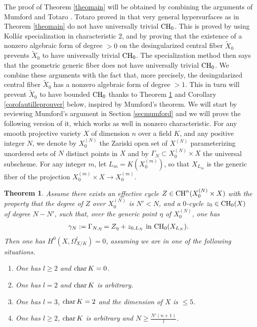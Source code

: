 \documentclass[10pt]{article}
\newtheorem{theo}{Theorem}[section]
\begin{document}
The proof of Theorem \ref{theomain} will be obtained by combining the arguments of Mumford \cite{mumford} and Totaro \cite{totaro}.  Totaro proved in \cite{totaro} that very general  hypersurfaces as in Theorem \ref{theomain} do not  have universally trivial ${\rm CH}_0$. This is proved by using  Koll\'ar specialization \cite{kollar} in characteristic $2$, and by proving that the existence of a nonzero algebraic form of degree $>0$ on the desingularized central  fiber  $\widetilde{X}_0$ prevents $\widetilde{X}_0$ to have universally trivial ${\rm CH}_0$.  The specialization method then says that the geometric generic fiber does not have universally trivial ${\rm CH}_0$. We combine these arguments with the fact that, more precisely,  the desingularized central  fiber  $\widetilde{X}_0$ has   a nonzero algebraic form of degree $>1$. This in turn will prevent $\widetilde{X}_0$ to have bounded ${\rm CH}_0$ thanks to Theorem \ref{theocrit} and  Corollary \ref{corofautilleprouver} below, inspired by Mumford's theorem.  We will start by reviewing  Mumford's argument in Section \ref{secmumford} and we will prove  the following version of it, which works as well in  nonzero characteristic. For any smooth projective variety $X$ of dimension $n$ over a field $K$, and any positive integer $N$, we denote by $X^{(N)}_0$ the Zariski open set of $X^{(N)}$ parameterizing unordered sets of $N$ distinct points in $X$ and by $\Gamma_N\subset X^{(N)}_0\times X$ the universal subscheme. For any integer $m$, let $L_m=K(X^{(m)}_0)$, so that  $X_{L_{m}}$ is the generic fiber of the projection $X^{(m)}_0\times X\rightarrow X^{(m)}_0$.
\begin{theo}\label{theocrit} Assume there exists an effective cycle $Z\in{\rm CH}^n(X^{(N)}_0\times X)$ with the property that the degree of $Z$ over $X^{(N)}_0$ is   $N'<N$, and a $0$-cycle $z_0\in {\rm CH}_0(X)$  of degree $N-N'$, such   that, over the generic point $\eta$ of $X^{(N)}_0$, one has
\begin{eqnarray}\label{eqgammaZx} \gamma_{N}:=\Gamma_{N,\eta}=Z_\eta+z_{0,L_N}\,\,{\rm in}\,\,{\rm CH}_0(X_{L_{N}}).
\end{eqnarray}
Then  one has $H^0(X,\Omega_{X/K}^l)=0$, assuming we are in one  of the following situations.
\begin{enumerate} \item \label{itsit1} One has $l\geq 2$ and ${\rm char}\,K=0$.
\item \label{itsit2} One has $l= 2$ and ${\rm char}\,K$ is arbitrary.
\item \label{itsit3} One has $l=3$, ${\rm char}\,K=2$ and the dimension of $X$ is $\leq 5$.
\item \label{itsit4} One has $l\geq 2$, ${\rm char}\,K$  is arbitrary and $N\geq\frac{ N'(n+1)}{l}$.
\end{enumerate}
\end{theo}
\end{document}
